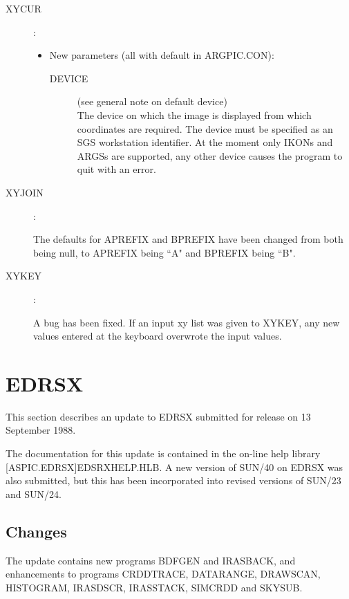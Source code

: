 \begin{description}
\item [XYCUR]:

\begin{itemize}
\item New parameters (all with default in ARGPIC.CON):
\begin{description}
\item [DEVICE](see general note on default device)\\
 The device on which the image is displayed from which coordinates are required.
 The device must be specified as an SGS workstation identifier.
 At the moment only IKONs and ARGSs are supported, any other device causes the
 program to quit with an error.
\end{description}
\end{itemize}

\item [XYJOIN]:

The defaults for APREFIX and BPREFIX have been changed from both being null,
to APREFIX being ``A" and BPREFIX being ``B".

\item [XYKEY]:

A bug has been fixed.
If an input xy list was given to XYKEY, any new values entered at the keyboard
overwrote the input values.

\end{description}

\section{EDRSX}

This section describes an update to EDRSX submitted for release on 13 September
1988.

The documentation for this update is contained in the on-line help
library [ASPIC.EDRSX]EDSRXHELP.HLB.
A new version of SUN/40 on EDRSX was also submitted, but this has been
incorporated into revised versions of SUN/23 and SUN/24.

\subsection{Changes}
The update contains new programs BDFGEN and IRASBACK, and enhancements
to programs CRDDTRACE, DATARANGE, DRAWSCAN, HISTOGRAM, IRASDSCR,
IRASSTACK, SIMCRDD and SKYSUB.



